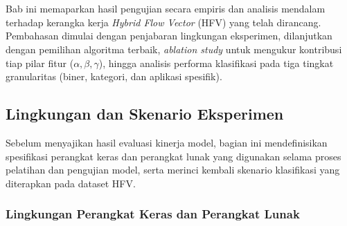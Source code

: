 \chapter{\babEmpat}
\label{cha:hasil_pembahasan}


Bab ini memaparkan hasil pengujian secara empiris dan analisis mendalam terhadap kerangka kerja \textit{Hybrid Flow Vector} (HFV) yang telah dirancang. Pembahasan dimulai dengan penjabaran lingkungan eksperimen, dilanjutkan dengan pemilihan algoritma terbaik, \textit{ablation study} untuk mengukur kontribusi tiap pilar fitur ($\alpha, \beta, \gamma$), hingga analisis performa klasifikasi pada tiga tingkat granularitas (biner, kategori, dan aplikasi spesifik).

\section{Lingkungan dan Skenario Eksperimen}
\label{sec:lingkungan_skenario}

Sebelum menyajikan hasil evaluasi kinerja model, bagian ini mendefinisikan spesifikasi perangkat keras dan perangkat lunak yang digunakan selama proses pelatihan dan pengujian model, serta merinci kembali skenario klasifikasi yang diterapkan pada dataset HFV.

\subsection{Lingkungan Perangkat Keras dan Perangkat Lunak}

